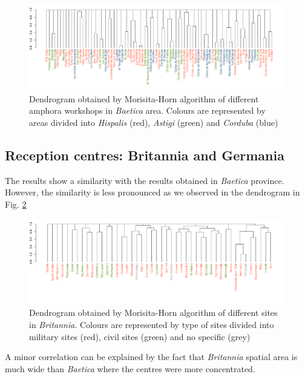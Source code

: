 \documentclass[review]{elsarticle}
\newcommand{\memo}[2]{\textcolor{#1}{#2}}
\newcommand{\xavi}[1]{\memo{magenta}{XRC: #1\\}}
\begin{document}
\begin{figure}
	\centering
\includegraphics[width=\linewidth]{figs/dendro}
\caption{Dendrogram obtained by Morisita-Horn algorithm of different amphora workshops in \textit{Baetica} area. Colours are represented by areas divided into \textit{Hispalis} (red), \textit{Astigi} (green) and \textit{Corduba} (blue)}
\label{dendro}
\end{figure} 


\subsection{Reception centres: Britannia and Germania}


The results show a similarity with the results obtained in \textit{Baetica} province. However, the similarity is less pronounced as we observed in the dendrogram in Fig. \ref{britmap}


\begin{figure}
	\centering
\includegraphics[width=\linewidth]{figs/dendrobrit5.pdf}
\caption{Dendrogram obtained by Morisita-Horn algorithm of different sites in \textit{Britannia}. Colours are represented by type of sites divided into military sites (red), civil sites (green) and no specific (grey)}
\label{britmap}
\end{figure}


A minor correlation can be explained by the fact that \textit{Britannia} spatial area is much wide than \textit{Baetica} where the centres were more concentrated.
\end{document}
